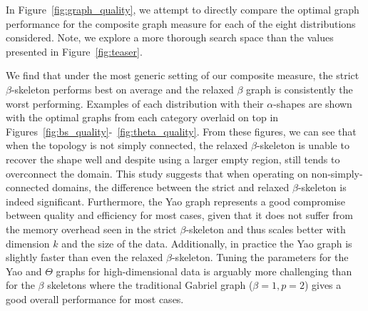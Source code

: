 In Figure~\ref{fig:graph_quality}, we attempt to directly compare the optimal graph performance for the composite graph measure for each of the eight distributions considered.
%
Note, we explore a more thorough search space than the values presented in Figure~\ref{fig:teaser}.
%

%
We find that under the most generic setting of our composite measure, the strict $\beta$-skeleton performs best on average and the relaxed $\beta$ graph is consistently the worst performing.
%
Examples of each distribution with their $\alpha$-shapes are shown with the optimal graphs from each category overlaid on top in Figures~\ref{fig:bs_quality}-~\ref{fig:theta_quality}.
%
From these figures, we can see that when the topology is not simply connected, the relaxed $\beta$-skeleton is unable to recover the shape well and despite using a larger empty region, still tends to overconnect the domain.
%
This study suggests that when operating on non-simply-connected domains, the difference between the strict and relaxed $\beta$-skeleton is indeed significant.
%
Furthermore, the Yao graph represents a good compromise between quality and efficiency for most cases, given that it does not suffer from the memory overhead seen in the strict $\beta$-skeleton and thus scales better with dimension $k$ and the size of the data.
%
Additionally, in practice the Yao graph is slightly faster than even the relaxed $\beta$-skeleton.
%
Tuning the parameters for the Yao and $\Theta$ graphs for high-dimensional data is arguably more challenging than for the $\beta$ skeletons where the traditional Gabriel graph ($\beta=1, p=2$) gives a good overall performance for most cases.

